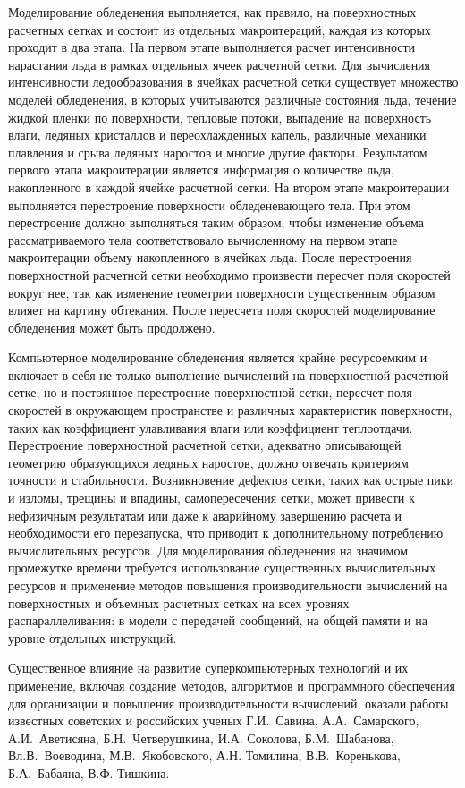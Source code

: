 \documentclass[a4paper,14pt]{extarticle}                     %
\theoremstyle{plain}                                         %
\begin{document}
Моделирование обледенения выполняется, как правило, на поверхностных расчетных сетках и состоит из отдельных макроитераций, каждая из которых проходит в два этапа.
На первом этапе выполняется расчет интенсивности нарастания льда в рамках отдельных ячеек расчетной сетки.
Для вычисления интенсивности ледообразования в ячейках расчетной сетки существует множество моделей обледенения, в которых учитываются различные состояния льда, течение жидкой пленки по поверхности, тепловые потоки, выпадение на поверхность влаги, ледяных кристаллов и переохлажденных капель, различные механики плавления и срыва ледяных наростов и многие другие факторы.
Результатом первого этапа макроитерации является информация о количестве льда, накопленного в каждой ячейке расчетной сетки.
На втором этапе макроитерации выполняется перестроение поверхности обледеневающего тела.
При этом перестроение должно выполняться таким образом, чтобы изменение объема рассматриваемого тела соответствовало вычисленному на первом этапе макроитерации объему накопленного в ячейках льда.
После перестроения поверхностной расчетной сетки необходимо произвести пересчет поля скоростей вокруг нее, так как изменение геометрии поверхности существенным образом влияет на картину обтекания.
После пересчета поля скоростей моделирование обледенения может быть продолжено.

Компьютерное моделирование обледенения является крайне ресурсоемким и включает в себя не только выполнение вычислений на поверхностной расчетной сетке, но и постоянное перестроение поверхностной сетки, пересчет поля скоростей в окружающем пространстве и различных характеристик поверхности, таких как коэффициент улавливания влаги или коэффициент теплоотдачи.
Перестроение поверхностной расчетной сетки, адекватно описывающей геометрию образующихся ледяных наростов, должно отвечать критериям точности и стабильности.
Возникновение дефектов сетки, таких как острые пики и изломы, трещины и впадины, самопересечения сетки, может привести к нефизичным результатам или даже к аварийному завершению расчета и необходимости его перезапуска, что приводит к дополнительному потреблению вычислительных ресурсов. 
Для моделирования обледенения на значимом промежутке времени требуется использование существенных вычислительных ресурсов и применение методов повышения производительности вычислений на поверхностных и объемных расчетных сетках на всех уровнях распараллеливания: в модели с передачей сообщений, на общей памяти и на уровне отдельных инструкций.

Существенное влияние на развитие суперкомпьютерных технологий и их применение, включая создание методов, алгоритмов и программного обеспечения для организации и повышения производительности вычислений, оказали работы известных советских и российских ученых Г.И.~Савина, А.А.~Самарского, А.И.~Аветисяна, Б.Н.~Четверушкина, И.А. Соколова, Б.М.~Шабанова, Вл.В.~Воеводина, М.В.~Якобовского, А.Н. Томилина, В.В.~Коренькова, Б.А.~Бабаяна, В.Ф. Тишкина. 
\end{document}
